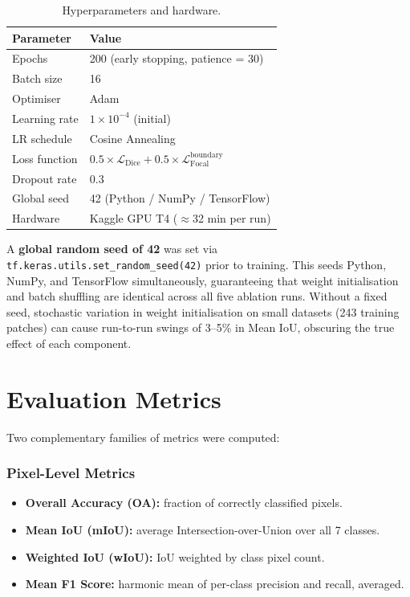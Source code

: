 \documentclass[12pt,a4paper]{article}
\begin{document}
\begin{table}[H]
\centering
\caption{Hyperparameters and hardware.}
\begin{tabular}{ll}
\toprule
\textbf{Parameter} & \textbf{Value} \\
\midrule
Epochs              & 200 (early stopping, patience = 30) \\
Batch size          & 16 \\
Optimiser           & Adam \\
Learning rate       & $1\times10^{-4}$ (initial) \\
LR schedule         & Cosine Annealing \\
Loss function       & $0.5 \times \mathcal{L}_\text{Dice} + 0.5 \times \mathcal{L}_\text{Focal}^\text{boundary}$ \\
Dropout rate        & 0.3 \\
Global seed         & 42 (Python / NumPy / TensorFlow) \\
Hardware            & Kaggle GPU T4 ($\approx$32 min per run) \\
\bottomrule
\end{tabular}
\end{table}

\noindent A \textbf{global random seed of 42} was set via
\texttt{tf.keras.utils.set\_random\_seed(42)} prior to training. This seeds
Python, NumPy, and TensorFlow simultaneously, guaranteeing that weight
initialisation and batch shuffling are identical across all five ablation
runs. Without a fixed seed, stochastic variation in weight initialisation
on small datasets (243 training patches) can cause run-to-run swings of
3--5\% in Mean IoU, obscuring the true effect of each component.

\section{Evaluation Metrics}

Two complementary families of metrics were computed:

\subsubsection*{Pixel-Level Metrics}
\begin{itemize}
  \item \textbf{Overall Accuracy (OA):} fraction of correctly classified pixels.
  \item \textbf{Mean IoU (mIoU):} average Intersection-over-Union over all 7 classes.
  \item \textbf{Weighted IoU (wIoU):} IoU weighted by class pixel count.
  \item \textbf{Mean F1 Score:} harmonic mean of per-class precision and recall, averaged.
\end{itemize}
\end{document}
